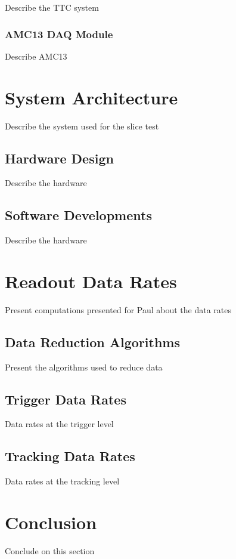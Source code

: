                 Describe the TTC system

            \subsubsection{AMC13 DAQ Module}

                Describe AMC13

    \section{System Architecture}

        Describe the system used for the slice test

        \subsection{Hardware Design}

            Describe the hardware

        \subsection{Software Developments}

            Describe the hardware

    \section{Readout Data Rates}

        Present computations presented for Paul about the data rates

        \subsection{Data Reduction Algorithms}

            Present the algorithms used to reduce data

        \subsection{Trigger Data Rates}

            Data rates at the trigger level

        \subsection{Tracking Data Rates}

            Data rates at the tracking level

    \section{Conclusion}

        Conclude on this section


